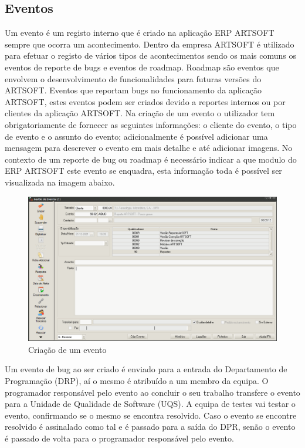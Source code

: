 \documentclass[sigplan]{acmart}
\begin{document}

\subsection{Eventos}

Um evento é um registo interno que é criado na aplicação ERP ARTSOFT sempre que ocorra um acontecimento. Dentro da empresa ARTSOFT é utilizado para efetuar o registo de vários tipos de acontecimentos sendo os mais comuns os eventos de reporte de bugs e eventos de roadmap. Roadmap são eventos que envolvem o desenvolvimento de funcionalidades para futuras versões do ARTSOFT. Eventos que reportam bugs no funcionamento da aplicação ARTSOFT, estes eventos podem ser criados devido a reportes internos ou por clientes da aplicação ARTSOFT. Na criação de um evento o utilizador tem obrigatoriamente de fornecer as seguintes informações: o cliente do evento, o tipo de evento e o assunto do evento; adicionalmente é possível adicionar uma mensagem para descrever o evento em mais detalhe e até adicionar imagens. No contexto de um reporte de bug ou roadmap é necessário indicar a que modulo do ERP ARTSOFT este evento se enquadra, esta informação toda é possível ser visualizada na imagem abaixo.
\begin{figure}[htbp]
	\centerline{\includegraphics[width=\linewidth]{figures/evento_criacao.png}}
	\caption{Criação de um evento}
	\label{fig1}
\end{figure}
Um evento de bug ao ser criado é enviado para a entrada do Departamento de Programação (DRP), aí o mesmo é atribuído a um membro da equipa. O programador responsável pelo evento ao concluir o seu trabalho transfere o evento para a Unidade de Qualidade de Software (UQS). A equipa de testes vai testar o evento, confirmando se o mesmo se encontra resolvido. Caso o evento se encontre resolvido é assinalado como tal e é passado para a saída do DPR, senão o evento é passado de volta para o programador responsável pelo evento.
\end{document}
